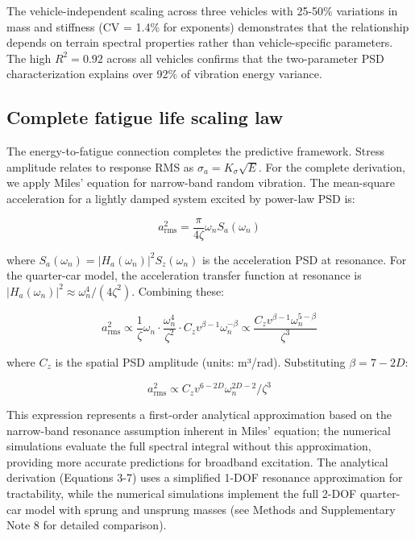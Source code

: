 \documentclass[11pt,letterpaper]{article}
\begin{document}
The vehicle-independent scaling across three vehicles with 25-50\% variations in mass and stiffness (CV = 1.4\% for exponents) demonstrates that the relationship depends on terrain spectral properties rather than vehicle-specific parameters. The high $R^2 = 0.92$ across all vehicles confirms that the two-parameter PSD characterization explains over 92\% of vibration energy variance.


\subsection{Complete fatigue life scaling law}

The energy-to-fatigue connection completes the predictive framework. Stress amplitude relates to response RMS as $\sigma_a = K_\sigma \sqrt{E}$\cite{Dowling2013,Lutes2004}. For the complete derivation, we apply Miles' equation for narrow-band random vibration\cite{Miles1954}. The mean-square acceleration for a lightly damped system excited by power-law PSD is:

\begin{equation}
a_{\text{rms}}^2 = \frac{\pi}{4\zeta} \omega_n S_a(\omega_n)
\end{equation}

where $S_a(\omega_n) = |H_a(\omega_n)|^2 S_z(\omega_n)$ is the acceleration PSD at resonance. For the quarter-car model, the acceleration transfer function at resonance is $|H_a(\omega_n)|^2 \approx \omega_n^4/(4\zeta^2)$. Combining these:

\begin{equation}
a_{\text{rms}}^2 \propto \frac{1}{\zeta} \omega_n \cdot \frac{\omega_n^4}{\zeta^2} \cdot C_z v^{\beta-1} \omega_n^{-\beta} \propto \frac{C_z v^{\beta-1} \omega_n^{5-\beta}}{\zeta^3}
\end{equation}

where $C_z$ is the spatial PSD amplitude (units: m³/rad). Substituting $\beta = 7-2D$:

\begin{equation}
a_{\text{rms}}^2 \propto C_z v^{6-2D} \omega_n^{2D-2} / \zeta^3
\end{equation}

This expression represents a first-order analytical approximation based on the narrow-band resonance assumption inherent in Miles' equation; the numerical simulations evaluate the full spectral integral without this approximation, providing more accurate predictions for broadband excitation. The analytical derivation (Equations 3-7) uses a simplified 1-DOF resonance approximation for tractability, while the numerical simulations implement the full 2-DOF quarter-car model with sprung and unsprung masses (see Methods and Supplementary Note 8 for detailed comparison).
\end{document}
